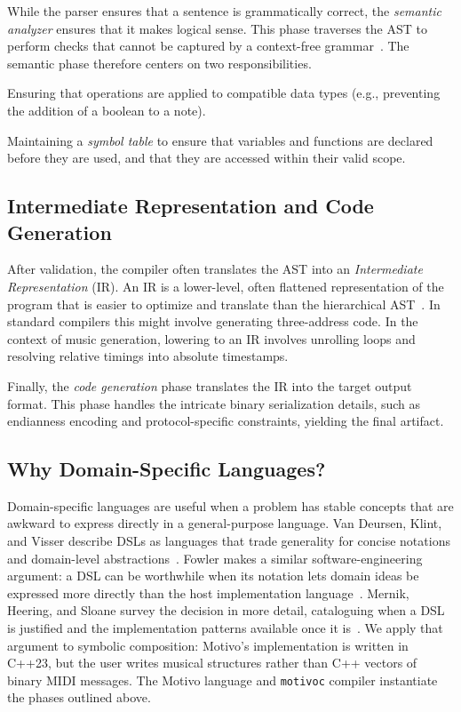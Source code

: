 While the parser ensures that a sentence is grammatically correct, the \textit{semantic analyzer} ensures that it makes
logical sense.
This phase traverses the AST to perform checks that cannot be captured by a context-free
grammar~\cite{Cooper_Torczon_2011}.
The semantic phase therefore centers on two responsibilities.

 Ensuring that operations are applied to compatible data types (e.g., preventing the
addition of a boolean to a note).

 Maintaining a \textit{symbol table} to ensure that variables and functions are
declared before they are used, and that they are accessed within their valid scope.

\subsection{Intermediate Representation and Code
Generation}\label{detail-subsec:intermediate-representation-and-code-generation}

After validation, the compiler often translates the AST into an \textit{Intermediate Representation} (IR).
An IR is a lower-level, often flattened representation of the program that is easier to optimize and translate than the
hierarchical AST~\cite{Cooper_Torczon_2011}.
In standard compilers this might involve generating three-address code.
In the context of music generation, lowering to an IR involves unrolling loops and resolving relative timings into
absolute timestamps.

Finally, the \textit{code generation} phase translates the IR into the target output format.
This phase handles the intricate binary serialization details, such as endianness encoding and protocol-specific
constraints, yielding the final artifact.

\subsection{Why Domain-Specific Languages?}\label{subsec:dsl-rationale}

Domain-specific languages are useful when a problem has stable concepts that are awkward to express directly
in a general-purpose language. Van Deursen, Klint, and Visser describe DSLs as languages that trade
generality for concise notations and domain-level abstractions~\cite{van_Deursen_Klint_Visser_2000}. Fowler
makes a similar software-engineering argument: a DSL can be worthwhile when its notation lets domain ideas be
expressed more directly than the host implementation language~\cite{Fowler_2010}.
Mernik, Heering, and Sloane survey the decision in more detail, cataloguing when a DSL is justified and the
implementation patterns available once it is~\cite{Mernik_Heering_Sloane_2005}.
We apply that argument to symbolic composition: Motivo's implementation is written in C++23, but the user writes musical
structures rather than C++ vectors of binary MIDI messages.
The Motivo language and \texttt{motivoc} compiler instantiate the phases outlined above.
